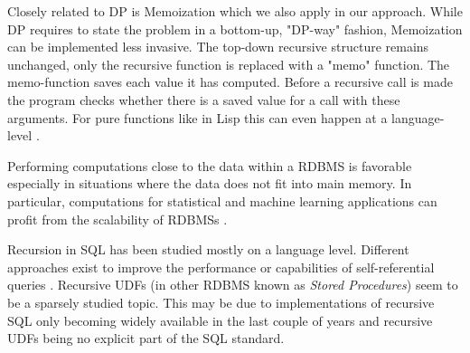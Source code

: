 Closely related to DP is Memoization \cite{memo} which we also apply in our approach. While DP requires to state the problem in a bottom-up, "DP-way" fashion, Memoization can be implemented less invasive. The top-down recursive structure remains unchanged, only the recursive function is replaced with a "memo" function. The memo-function saves each value it has computed. Before a recursive call is made the program checks whether there is a saved value for a call with these arguments. For pure functions like in Lisp this can even happen at a language-level \cite{norvig_memoization}. \cite[p. 390 ff.]{Cormen}

Performing computations close to the data within a RDBMS is favorable especially in situations where the data does not fit into main memory. In particular, computations for statistical and machine learning applications can profit from the scalability of RDBMSs \cite{SQLforML,PCAinSQL,MLwithUDFs,MLinSQL2,decisionTables}.

Recursion in SQL has been studied mostly on a language level. Different approaches exist to improve the performance or capabilities of self-referential queries \cite{LRoptimizations, optimizingRecursiveQueries, extendingRecursionInSQL, RCTEplanningOptimization}. Recursive UDFs (in other RDBMS known as \textit{Stored Procedures}) seem to be a sparsely studied topic. This may be due to implementations of recursive SQL only becoming widely available in the last couple of years \cite{RSQLsurvey} and recursive UDFs being no explicit part of the SQL standard.